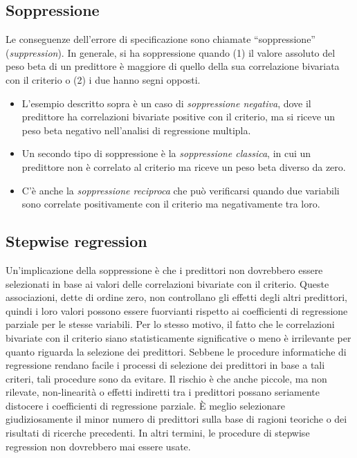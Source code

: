 \documentclass[
  11pt,
]{krantz}
\providecommand{\tightlist}{%
  \setlength{\itemsep}{0pt}\setlength{\parskip}{0pt}}
\theoremstyle{definition}
\theoremstyle{definition}
\theoremstyle{definition}
\theoremstyle{definition}
\theoremstyle{remark}
\begin{document}
\hypertarget{soppressione}{%
\subsection{Soppressione}\label{soppressione}}

Le conseguenze dell'errore di specificazione sono chiamate ``soppressione'' (\emph{suppression}). In generale, si ha soppressione quando (1) il valore assoluto del peso beta di un predittore è maggiore di quello della sua correlazione bivariata con il criterio o (2) i due hanno segni opposti.

\begin{itemize}
\tightlist
\item
  L'esempio descritto sopra è un caso di \emph{soppressione negativa}, dove il predittore ha correlazioni bivariate positive con il criterio, ma si riceve un peso beta negativo nell'analisi di regressione multipla.
\item
  Un secondo tipo di soppressione è la \emph{soppressione classica}, in cui un predittore non è correlato al criterio ma riceve un peso beta diverso da zero.
\item
  C'è anche la \emph{soppressione reciproca} che può verificarsi quando due variabili sono correlate positivamente con il criterio ma negativamente tra loro.
\end{itemize}

\hypertarget{stepwise-regression}{%
\subsection{Stepwise regression}\label{stepwise-regression}}

Un'implicazione della soppressione è che i predittori non dovrebbero essere selezionati in base ai valori delle correlazioni bivariate con il criterio. Queste associazioni, dette di ordine zero, non controllano gli effetti degli altri predittori, quindi i loro valori possono essere fuorvianti rispetto ai coefficienti di regressione parziale per le stesse variabili. Per lo stesso motivo, il fatto che le correlazioni bivariate con il criterio siano statisticamente significative o meno è irrilevante per quanto riguarda la selezione dei predittori. Sebbene le procedure informatiche di regressione rendano facile i processi di selezione dei predittori in base a tali criteri, tali procedure sono da evitare. Il rischio è che anche piccole, ma non rilevate, non-linearità o effetti indiretti tra i predittori possano seriamente distocere i coefficienti di regressione parziale. È meglio selezionare giudiziosamente il minor numero di predittori sulla base di ragioni teoriche o dei risultati di ricerche precedenti. In altri termini, le procedure di stepwise regression non dovrebbero mai essere usate.
\end{document}
